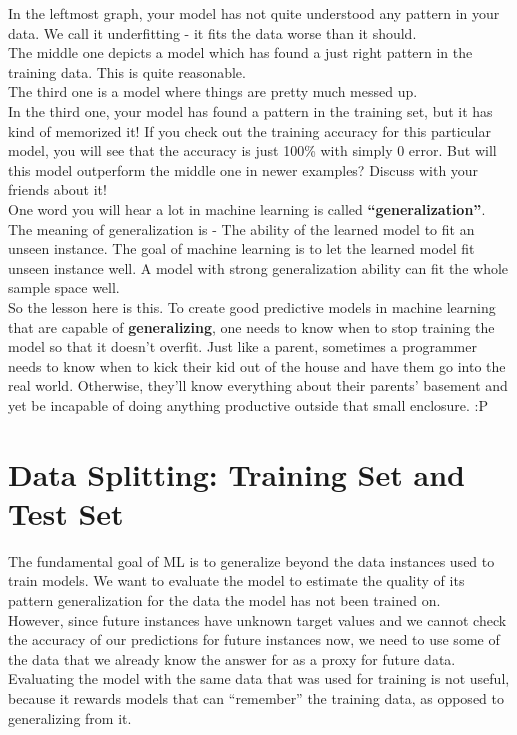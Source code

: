 \documentclass{42-en}
\begin{document}
In the leftmost graph, your model has not quite understood any pattern in your data. We call it underfitting - it fits the data worse than it should.\\
The middle one depicts a model which has found a just right pattern in the training data. This is quite reasonable.\\
The third one is a model where things are pretty much messed up.\\
In the third one, your model has found a pattern in the training set, but it has kind of memorized it! If you check out the training accuracy for this particular model, you will see that the accuracy is just 100\% with simply 0 error. But will this model outperform the middle one in newer examples? Discuss with your friends about it!\\
One word you will hear a lot in machine learning is called \textbf{“generalization”}. The meaning of generalization is - The ability of the learned model to fit an unseen instance. The goal of machine learning is to let the learned model fit unseen instance well. A model with strong generalization ability can fit the whole sample space well.\\
So the lesson here is this. To create good predictive models in machine learning that are capable of \textbf{generalizing}, one needs to know when to stop training the model so that it doesn't overfit. Just like a parent, sometimes a programmer needs to know when to kick their kid out of the house and have them go into the real world. Otherwise, they'll know everything about their parents' basement and yet be incapable of doing anything productive outside that small enclosure. :P\\

\section*{Data Splitting: Training Set and Test Set}

The fundamental goal of ML is to generalize beyond the data instances used to train models. We want to evaluate the model to estimate the quality of its pattern generalization for the data the model has not been trained on.\\

However, since future instances have unknown target values and we cannot check the accuracy of our predictions for future instances now, we need to use some of the data that we already know the answer for as a proxy for future data. Evaluating the model with the same data that was used for training is not useful, because it rewards models that can “remember” the training data, as opposed to generalizing from it.\\
\end{document}
